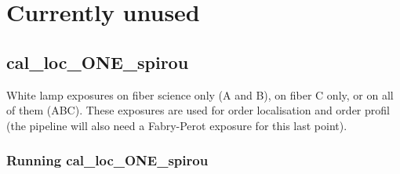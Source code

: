 







\clearpage
\newpage
\section{Currently unused}

\subsection{cal\_loc\_ONE\_spirou}

White lamp exposures on fiber science only (A and B), on fiber C only, or on all of them (ABC). These exposures are used for order localisation and order profil (the pipeline will also need a Fabry-Perot exposure for this last point).

\subsubsection{Running cal\_loc\_ONE\_spirou}

